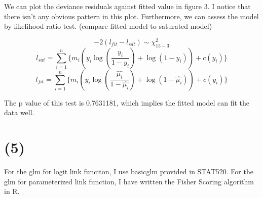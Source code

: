 \documentclass[12pt]{article}
\begin{document}
We can plot the deviance residuals against fitted value in figure 3.  I notice that there isn't any obvious pattern in this plot. Furthermore, we can assess the model by likelihood ratio test. (compare fitted model to saturated model)

$$-2(l_{fit} - l_{sat}) \sim \chi^{2}_{15-3}$$
$$ l_{sat}= \sum_{i=1}^{n}  \{ m_i  (y_i \log(\frac{y_i}{1-y_i}) + \log(1-y_i) ) + c(y_i) \}$$
$$ l_{fit}= \sum_{i=1}^{n}  \{ m_i  (y_i \log(\frac{\hat{\mu_i}}{1-\hat{\mu_i}}) + \log(1-\hat{\mu_i}) ) + c(y_i) \}$$

The p value of this test is 0.7631181, which implies the fitted model can fit the data well.




\section*{(5)}
For the glm for logit link funciton, I use basicglm provided in STAT520.
For the glm for parameterized link function, I have written the Fisher Scoring algorithm in R.
\end{document}

